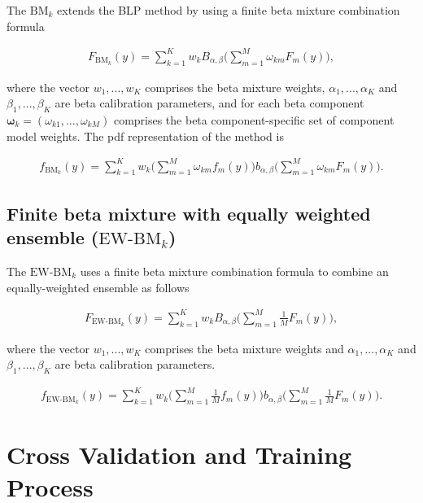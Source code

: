 \documentclass[
]{article}
\begin{document}
The \(\text{BM}_k\) extends the BLP method by using a finite beta
mixture combination formula

\begin{align}
F_{\text{BM}_k}(y)=\sum_{k=1}^K w_kB_{\alpha,\beta}\Big(\sum_{m=1}^M \omega_{km} F_m(y)\Big),
\end{align}

where the vector \(w_1,..., w_K\) comprises the beta mixture weights,
\(\alpha_1,..., \alpha_K\) and \(\beta_1,..., \beta_K\) are beta
calibration parameters, and for each beta component
\(\boldsymbol{\omega}_k=(\omega_{k1},..., \omega_{kM})\) comprises the
beta component-specific set of component model weights. The pdf
representation of the method is

\begin{align}
f_{\text{BM}_k}(y)=\sum_{k=1}^K w_k(\sum_{m=1}^M \omega_{km} f_m(y)\Big)b_{\alpha,\beta}\Big(\sum_{m=1}^M \omega_{km} F_m(y)\Big).
\end{align}

\hypertarget{finite-beta-mixture-with-equally-weighted-ensemble-textew-bm_k}{%
\subsection{\texorpdfstring{Finite beta mixture with equally weighted
ensemble
(\(\text{EW-BM}_k\))}{Finite beta mixture with equally weighted ensemble (\textbackslash text\{EW-BM\}\_k)}}\label{finite-beta-mixture-with-equally-weighted-ensemble-textew-bm_k}}

The \(\text{EW-BM}_k\) uses a finite beta mixture combination formula to
combine an equally-weighted ensemble as follows

\begin{align}
F_{\text{EW-BM}_k}(y)=\sum_{k=1}^K w_kB_{\alpha,\beta}\Big(\sum_{m=1}^M \frac{1}{M} F_m(y)\Big),
\end{align}

where the vector \(w_1,..., w_K\) comprises the beta mixture weights and
\(\alpha_1,..., \alpha_K\) and \(\beta_1,..., \beta_K\) are beta
calibration parameters.

\begin{align}
f_{\text{EW-BM}_k}(y)=\sum_{k=1}^K w_k(\sum_{m=1}^M \frac{1}{M} f_m(y)\Big)b_{\alpha,\beta}\Big(\sum_{m=1}^M \frac{1}{M} F_m(y)\Big).
\end{align}

\hypertarget{cross-validation-and-training-process}{%
\section{Cross Validation and Training
Process}\label{cross-validation-and-training-process}}
\end{document}
